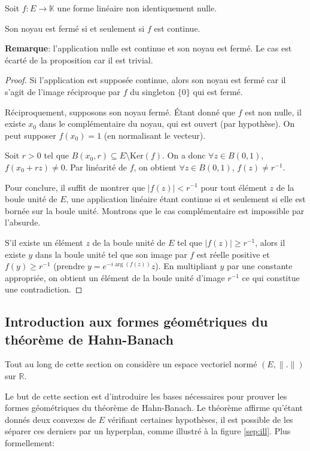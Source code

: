 \begin{prop}
  Soit $f: E \to\mathbb{K}$ une forme linéaire
  non identiquement nulle.

  Son noyau est fermé si et seulement si $f$ est continue.
\end{prop}

\textbf{Remarque}: l'application nulle est continue et son
noyau est fermé. Le cas est écarté de la proposition car
il est trivial.

\begin{proof}
  Si l'application est supposée continue, alors son noyau est
  fermé car il s'agit de l'image réciproque par $f$ du singleton
  $\{0\}$ qui est fermé.

  Réciproquement, supposons son noyau fermé. \'{E}tant donné que
  $f$ est non nulle, il existe $x_0$ dans le complémentaire du
  noyau, qui est ouvert (par hypothèse). On peut supposer $f(x_0)=1$
  (en normalisant le vecteur).

  Soit $r>0$ tel que $B(x_0, r)\subseteq E\setminus\mathrm{Ker}(f)$.
  On a donc $\forall z\in B(0, 1)$, $f(x_0 + rz )\neq 0$. Par
  linéarité de $f$, on obtient
  $\forall z\in B(0, 1)$, $f(z)\neq r^{-1}$.

  Pour conclure, il suffit de montrer que $|f(z)|< r^{-1}$ pour tout
  élément $z$ de la boule unité de $E$, une application linéaire
  étant continue si et seulement si elle est bornée sur la boule
  unité. Montrons que le
  cas complémentaire est impossible par l'absurde.

  S'il existe un élément $z$ de la boule unité de $E$ tel que
  $|f(z)|\geq r^{-1}$, alors il existe $y$ dans la boule unité
  tel que son image par $f$ est réelle positive et $f(y)\geq r^{-1}$
  (prendre $y = e^{-i\arg(f(z))}z$). En multipliant $y$ par une
  constante appropriée, on obtient un élément de la boule
  unité d'image $r^{-1}$ ce qui constitue une contradiction.

\end{proof}

\subsection{Introduction aux formes géométriques du
  théorème de Hahn-Banach}

Tout au long de cette section on considère un espace vectoriel
normé $(E, \|.\|)$ sur $\mathbb{R}$.

Le but de cette section est d'introduire les bases nécessaires
pour prouver les formes géométriques du théorème de Hahn-Banach.
Le théorème affirme qu'étant donnés deux convexes de $E$
vérifiant certaines hypothèses, il est
possible de les séparer ces derniers par un hyperplan, comme
illustré à la figure \ref{sep:ill}. Plus formellement:

